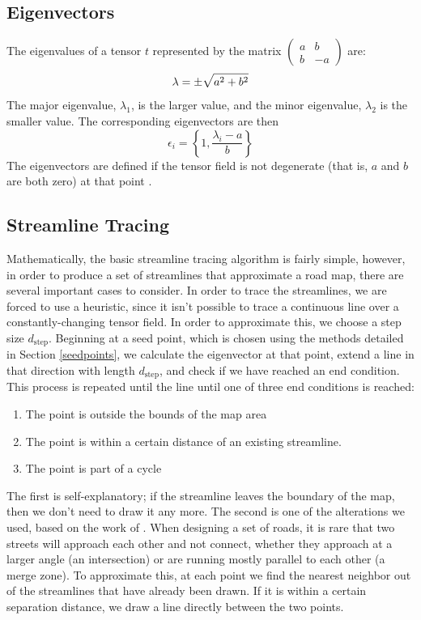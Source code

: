 \documentclass[twocolumn]{article}
\newcommand{\sqmat}[4]{\ensuremath{
    \left(\begin{array}{cc}
        #1 & #2 \\
        #3 & #4
    \end{array}\right)}}
\begin{document}
\subsection{Eigenvectors}
The eigenvalues of a tensor $t$ represented by the matrix $\sqmat{a}{b}{b}{-a}$
are:
\[
    \lambda = \pm\sqrt{a^2+b^2} \\
\]
The major eigenvalue, $\lambda_1$, is the larger value, and the minor
eigenvalue, $\lambda_2$ is the smaller value. The corresponding eigenvectors
are then
\[
    \epsilon_i = \left\{1,\frac{\lambda_i-a}{b}\right\}
\]
The eigenvectors are defined if the tensor field is not degenerate (that is,
$a$ and $b$ are both zero) at that point \cite{find-evs}.

\subsection{Streamline Tracing}
Mathematically, the basic streamline tracing algorithm is fairly simple,
however, in order to produce a set of streamlines that approximate a road map,
there are several important cases to consider. In order to trace the
streamlines, we are forced to use a heuristic, since it isn’t possible to trace
a continuous line over a constantly-changing tensor field. In order to
approximate this, we choose a step size $d_\textrm{step}$. Beginning at a seed
point, which is chosen using the methods detailed in Section \ref{seedpoints},
we calculate the eigenvector at that point, extend a line in that direction
with length $d_\textrm{step}$, and check if we have reached an end condition.
This process is repeated until the line until one of three end conditions is
reached:
\begin{enumerate}
    \item The point is outside the bounds of the map area
    \item The point is within a certain distance of an existing streamline.
    \item The point is part of a cycle
\end{enumerate}

The first is self-explanatory; if the streamline leaves the boundary of the
map, then we don’t need to draw it any more. The second is one of the
alterations we used, based on the work of \cite{chen}. When designing a set of
roads, it is rare that two streets will approach each other and not connect,
whether they approach at a larger angle (an intersection) or are running mostly
parallel to each other (a merge zone). To approximate this, at each point we
find the nearest neighbor out of the streamlines that have already been drawn.
If it is within a certain separation distance, we draw a line directly between
the two points.
\end{document}
